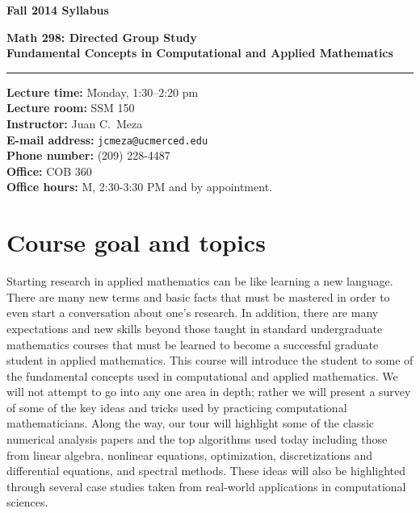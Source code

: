 \documentclass[11pt]{article}
\begin{document}
\centerline{{\bf \Large Fall 2014 Syllabus}}
\vspace{.2in}
{\bf \large Math 298: Directed Group Study} \\
{\bf \large Fundamental Concepts in Computational and Applied Mathematics} \\
\rule{6.5in}{.02in}


\begin{tabbing}
{\bf Lecture time:} \quad \quad \= Monday, 1:30--2:20 pm \\
{\bf Lecture room:} \> SSM 150 \\
{\bf Instructor:} \> Juan C.~Meza \\
{\bf E-mail address:} \> {\tt jcmeza@ucmerced.edu} \\
{\bf Phone number:} \> (209) 228-4487 \\
{\bf Office:} \> COB 360 \\
{\bf Office hours:} \> M, 2:30-3:30 PM and by appointment. \\
\end{tabbing}

\section*{Course goal and topics} Starting research in applied mathematics can be like learning a new language.  There are many new terms and basic facts that must be mastered in order to even start a conversation about one's research.  In addition, there are many expectations and new skills beyond those taught in standard undergraduate mathematics courses that must be learned to become a successful graduate student in applied mathematics.  This course will introduce the student to some of the fundamental concepts used in computational and applied mathematics.  We will not attempt to go into any one area in depth; rather we will present a survey of some of the key ideas and tricks used by practicing computational mathematicians.  Along the way, our tour will highlight some of the classic numerical analysis papers and the top algorithms used today including those from linear algebra, nonlinear equations, optimization, discretizations and differential equations, and spectral methods.  These ideas will also be highlighted through several case studies taken from real-world applications in computational sciences.
\end{document}
